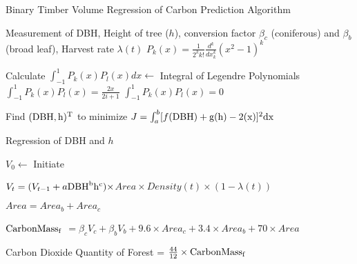 \documentclass{mcmthesis}
\numberwithin{figure}{section}
\numberwithin{table}{section}
\numberwithin{equation}{section}
\begin{document}
\begin{algorithm}[htbp]
    \caption{Binary Timber Volume Regression of Carbon Prediction Algorithm}\label{Binary Volume Algo}
    \begin{algorithmic}[1]
      \Require
        Measurement of DBH, Height of tree ($ h $), conversion factor 
        $ \beta_c $  (coniferous) and $ \beta_b $ (broad leaf), Harvest rate $ \lambda(t) $ 
        $ P_k(x) = \frac{1}{2^kk!}\frac{d^k}{dx_k^k}(x^2-1)^k $

        \quad \quad Calculate $ \int_{-1}^{1}P_k(x)P_l(x)dx \gets $ Integral of Legendre Polynomials
        $ \int_{-1}^1P_k(x)P_l(x) = \frac{2x}{2i+1} $
        \Else $ \int_{-1}^1P_k(x)P_l(x) = 0 $   
        \EndIf 
        \EndFor
        \EndFor
        \EndFor
        
        \noindent Find $ (\rm{DBH}, h)^T $ to minimize  $ J = \int_a^b[f(\rm{DBH})+g(h)-2(x)]^2dx $

        Regression of DBH and $ h $  

        $V_0 \gets$ Initiate

        $ V_t = (V_{t-1}+a\rm{DBH}^bh^c)\times $$Area\times Density(t) \times (1-\lambda(t)) $
        \EndFor

        \noindent$ Area = Area_b + Area_c $

        \noindent $ \rm{CarbonMass_f} $  $= \beta_cV_c+\beta_bV_b+9.6\times Area_c+3.4\times Area_b + 70\times Area$

        \Ensure
        Carbon Dioxide Quantity of Forest = $\frac{44}{12}\times\rm{CarbonMass_f}$ 
    \end{algorithmic}
  \end{algorithm}
  
\end{document}
